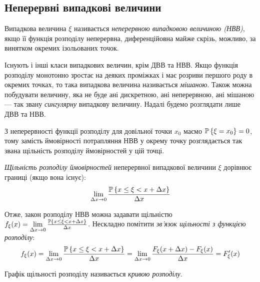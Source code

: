 \subsection{Неперервні випадкові величини}
\begin{definition}
    Випадкова величина $\xi$ називається \emph{неперервною випадковою величиною (НВВ)},
    якщо її функція розподілу неперервна, диференційовна майже скрізь, можливо, за винятком
    окремих ізольованих точок.
\end{definition}
\begin{remark}
    Існують і інші класи випадкових величин, крім ДВВ та НВВ. Якщо функція розподілу
    монотонно зростає на деяких проміжках і має розриви першого роду в окремих точках,
    то така випадкова величина називається \emph{мішаною}. Також можна побудувати величину,
    яка не буде ані дискретною, ані неперервною, ані мішаною --- так звану \emph{сингулярну} випадкову величину.
    Надалі будемо розглядати лише ДВВ та НВВ.
\end{remark}
З неперервності функції розподілу для довільної точки $x_0$ маємо $\P\left\{\xi = x_0\right\} = 0$, тому
замість ймовірності потрапляння НВВ у окрему точку розглядається так звана щільність розподілу ймовірностей у цій точці.

\begin{definition}
    \emph{Щільність розподілу ймовірностей} неперервної випадкової величини $\xi$
    дорівнює границі (якщо вона існує):
    \begin{equation}\label{eq:prob_dens}
        \lim_{\Delta x\rightarrow 0} \frac{\P\left\{x\leq \xi < x+\Delta x\right\}}{\Delta x}
    \end{equation}
\end{definition}
Отже, закон розподілу НВВ можна задавати щільністю $f_\xi(x) = \lim\limits_{\Delta x\rightarrow 0} \frac{\P\left\{x\leq \xi < x+\Delta x\right\}}{\Delta x}$.
Нескладно помітити \emph{зв'язок щільності з функцією розподілу}:
\begin{equation}\label{eq:dens_pdf}
    f_\xi(x) = \lim\limits_{\Delta x\rightarrow 0} \frac{\P\left\{x\leq \xi < x+\Delta x\right\}}{\Delta x} = 
    \lim\limits_{\Delta x\rightarrow 0} \frac{F_\xi(x+\Delta x) - F_\xi(x)}{\Delta x} = F'_\xi(x)
\end{equation}
\begin{definition}
    Графік щільності розподілу називається \emph{кривою розподілу}.
\end{definition}

